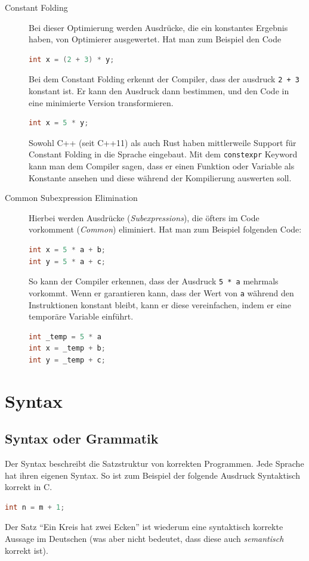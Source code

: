 \documentclass[ngerman]{scrartcl}
\begin{document}
\begin{description}
\item[Constant Folding] Bei dieser Optimierung werden Ausdrücke, die ein konstantes Ergebnis haben, von Optimierer ausgewertet. Hat man zum Beispiel den Code
\begin{lstlisting}[language=C]
int x = (2 + 3) * y;
\end{lstlisting}
Bei dem Constant Folding erkennt der Compiler, dass der ausdruck \verb|2 + 3| konstant ist. Er kann den Ausdruck dann bestimmen, und den Code in eine minimierte Version transformieren.
\begin{lstlisting}[language=C]
int x = 5 * y;
\end{lstlisting}
\begin{anmerkung}
Sowohl C++ (seit C++11) als auch Rust haben mittlerweile Support für Constant Folding in die Sprache eingebaut. Mit dem \verb|constexpr| Keyword kann man dem Compiler sagen, dass er einen Funktion oder Variable als Konstante ansehen und diese während der Kompilierung auswerten soll.
\end{anmerkung}
\item[Common Subexpression Elimination] Hierbei werden Ausdrücke (\emph{Subexpressions}), die öfters im Code vorkomment (\emph{Common}) eliminiert. Hat man zum Beispiel folgenden Code:
\begin{lstlisting}[language=C]
int x = 5 * a + b;
int y = 5 * a + c;
\end{lstlisting}
So kann der Compiler erkennen, dass der Ausdruck \verb|5 * a| mehrmals vorkommt. Wenn er garantieren kann, dass der Wert von \verb|a| während den Instruktionen konstant bleibt, kann er diese vereinfachen, indem er eine temporäre Variable einführt.
\begin{lstlisting}[language=C]
int _temp = 5 * a
int x = _temp + b;
int y = _temp + c;
\end{lstlisting}
\end{description}


\section{Syntax}

\subsection{Syntax oder Grammatik}

Der Syntax beschreibt die Satzstruktur von korrekten Programmen. Jede Sprache hat ihren eigenen Syntax. So ist zum Beispiel der folgende Ausdruck Syntaktisch korrekt in C.
\begin{lstlisting}[language=C]
int n = m + 1;
\end{lstlisting}
Der Satz \enquote{Ein Kreis hat zwei Ecken} ist wiederum eine syntaktisch korrekte Aussage im Deutschen (was aber nicht bedeutet, dass diese auch \emph{semantisch} korrekt ist).
\end{document}
